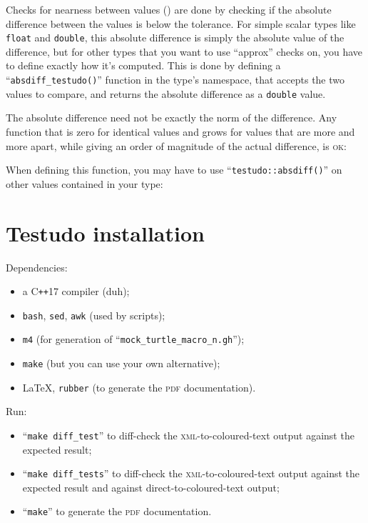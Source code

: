 \documentclass[twoside, a4paper, article]{memoir}
\providecommand\typesetexample[1]{%
}
\newcommand*\Cpp{C\texttt{++}}
\begin{document}
Checks for nearness between values ()
are done by checking if the absolute difference between the values is below the
tolerance.  For simple scalar types like \texttt{float} and \texttt{double},
this absolute difference is simply the absolute value of the difference, but
for other types that you want to use ``approx'' checks on, you have to define
exactly how it's computed.  This is done by defining a
``\texttt{absdiff\_testudo()}'' function in the type's namespace, that accepts
the two values to compare, and returns the absolute difference as a
\texttt{double} value.

\typesetexample{testudo-support-my-vector-absdiff-testudo}

The absolute difference need not be exactly the norm of the difference.  Any
function that is zero for identical values and grows for values that are more
and more apart, while giving an order of magnitude of the actual difference, is
\textsc{ok}:

\typesetexample{testudo-support-my-vector-absdiff-testudo-manhattan}

When defining this function, you may have to use
``\texttt{testudo::absdiff()}'' on other values contained in your type:

\typesetexample{testudo-support-my-vector-absdiff-testudo-absdiff}


\cleartooddpage

\appendices

\chapter{Testudo installation}
\label{cha:testudo-installation}

Dependencies:
\begin{itemize}
\item a \Cpp{}17 compiler (duh);
\item \texttt{bash}, \texttt{sed}, \texttt{awk} (used by scripts);
\item \texttt{m4} (for generation of ``\texttt{mock\_turtle\_macro\_n.gh}'');
\item \texttt{make} (but you can use your own alternative);
\item \LaTeX{}, \texttt{rubber} (to generate the \textsc{pdf} documentation).
\end{itemize}

Run:
\begin{itemize}
\item ``\texttt{make diff\_test}'' to diff-check the
  \textsc{xml}-to-coloured-text output against the expected result;
\item ``\texttt{make diff\_tests}'' to diff-check the
  \textsc{xml}-to-coloured-text output against the expected result and against
  direct-to-coloured-text output;
\item ``\texttt{make}'' to generate the \textsc{pdf} documentation.
\end{itemize}
\end{document}
